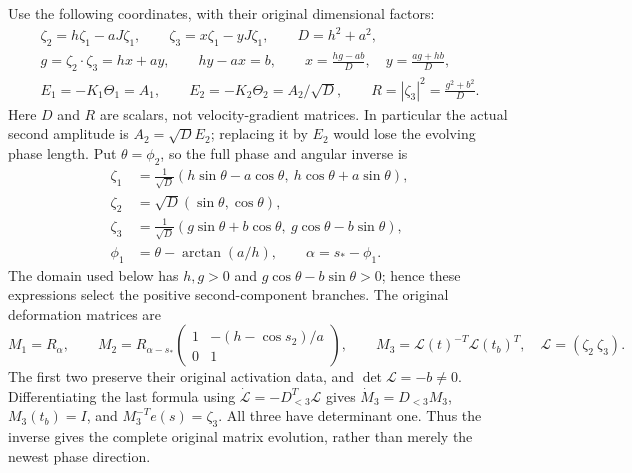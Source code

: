 Use the following coordinates, with their original dimensional factors:
\begin{equation}\label{tt:coordinates}
\begin{gathered}
 \zeta_2=h\zeta_1-aJ\zeta_1,\qquad
 \zeta_3=x\zeta_1-yJ\zeta_1,\qquad D=h^2+a^2,\\
 g=\zeta_2\cdot\zeta_3=hx+ay,\qquad
 hy-ax=b,\qquad
 x=\frac{hg-ab}{D},\quad y=\frac{ag+hb}{D},\\
 E_1=-K_1\Theta_1=A_1,\qquad
 E_2=-K_2\Theta_2=A_2/\sqrt D,\qquad
 R=|\zeta_3|^2=\frac{g^2+b^2}{D}.
\end{gathered}
\end{equation}
Here $D$ and $R$ are scalars, not velocity-gradient matrices.
In particular the actual second amplitude is $A_2=\sqrt D E_2$;
replacing it by $E_2$ would lose the evolving phase length.
Put $\theta=\phi_2$, so the full phase and angular inverse is
\begin{align}\label{tt:inverse}
 \zeta_1&=\frac1{\sqrt D}
    (h\sin\theta-a\cos\theta,\ h\cos\theta+a\sin\theta),\\
 \zeta_2&=\sqrt D(\sin\theta,\cos\theta),\nonumber\\
 \zeta_3&=\frac1{\sqrt D}
    (g\sin\theta+b\cos\theta,\ g\cos\theta-b\sin\theta),\nonumber\\
 \phi_1&=\theta-\arctan(a/h),\qquad
 \alpha=s_*-\phi_1.\nonumber
\end{align}
The domain used below has $h,g>0$ and
$g\cos\theta-b\sin\theta>0$; hence these expressions select the
positive second-component branches. The original deformation matrices are
\begin{equation}\label{tt:matrices}
 M_1=R_\alpha,\qquad
 M_2=R_{\alpha-s_*}
 \begin{pmatrix}1&-(h-\cos s_2)/a\\0&1\end{pmatrix},\qquad
 M_3=\mathcal L(t)^{-T}\mathcal L(t_b)^T,
 \quad\mathcal L=(\zeta_2\ \zeta_3).
\end{equation}
The first two preserve their original activation data, and
$\det\mathcal L=-b\ne0$. Differentiating the last formula using
$\dot{\mathcal L}=-D_{<3}^T\mathcal L$ gives
$\dot M_3=D_{<3}M_3$, $M_3(t_b)=I$, and
$M_3^{-T}e(s)=\zeta_3$. All three have determinant one.
Thus the inverse gives the complete original matrix evolution, rather
than merely the newest phase direction.

